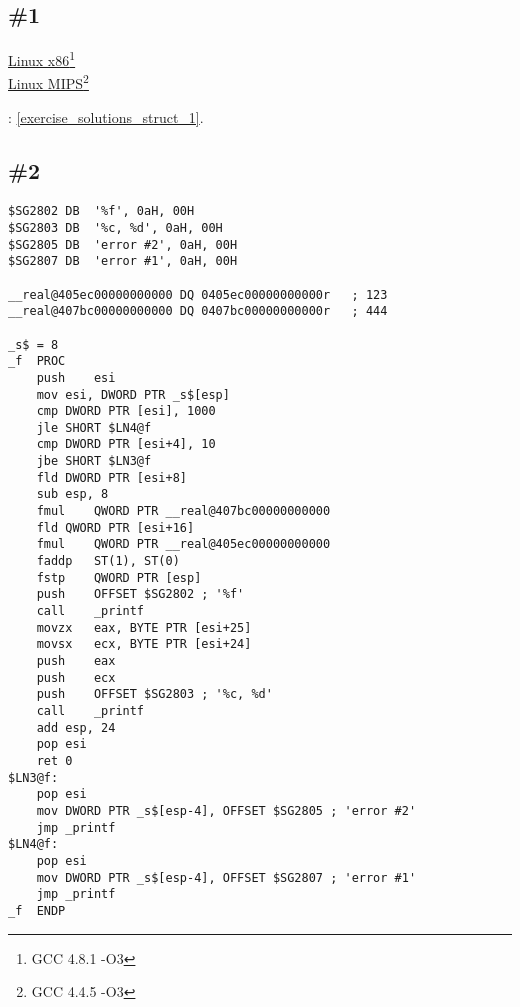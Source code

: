 \section{\Exercises}

\subsection{\Exercise \#1}
\label{exercise_struct_1}

\href{http://go.yurichev.com/17217}{Linux x86}\footnote{GCC 4.8.1 -O3}\\
\href{http://go.yurichev.com/17218}{Linux MIPS}\footnote{GCC 4.4.5 -O3}\\

\Answer{}: \ref{exercise_solutions_struct_1}.

\subsection{\Exercise \#2}
\label{exercise_struct_2}


\begin{lstlisting}[caption=\Optimizing MSVC 2010]
$SG2802	DB	'%f', 0aH, 00H
$SG2803	DB	'%c, %d', 0aH, 00H
$SG2805	DB	'error #2', 0aH, 00H
$SG2807	DB	'error #1', 0aH, 00H

__real@405ec00000000000 DQ 0405ec00000000000r	; 123
__real@407bc00000000000 DQ 0407bc00000000000r	; 444

_s$ = 8
_f	PROC
	push	esi
	mov	esi, DWORD PTR _s$[esp]
	cmp	DWORD PTR [esi], 1000
	jle	SHORT $LN4@f
	cmp	DWORD PTR [esi+4], 10
	jbe	SHORT $LN3@f
	fld	DWORD PTR [esi+8]
	sub	esp, 8
	fmul	QWORD PTR __real@407bc00000000000
	fld	QWORD PTR [esi+16]
	fmul	QWORD PTR __real@405ec00000000000
	faddp	ST(1), ST(0)
	fstp	QWORD PTR [esp]
	push	OFFSET $SG2802 ; '%f'
	call	_printf
	movzx	eax, BYTE PTR [esi+25]
	movsx	ecx, BYTE PTR [esi+24]
	push	eax
	push	ecx
	push	OFFSET $SG2803 ; '%c, %d'
	call	_printf
	add	esp, 24
	pop	esi
	ret	0
$LN3@f:
	pop	esi
	mov	DWORD PTR _s$[esp-4], OFFSET $SG2805 ; 'error #2'
	jmp	_printf
$LN4@f:
	pop	esi
	mov	DWORD PTR _s$[esp-4], OFFSET $SG2807 ; 'error #1'
	jmp	_printf
_f	ENDP
\end{lstlisting}

